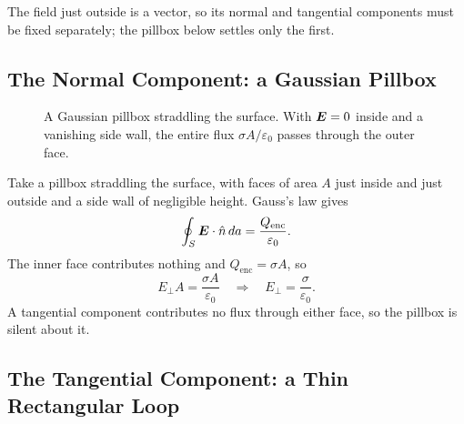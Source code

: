 The field just outside is a vector, so its normal and tangential components must be fixed separately; the pillbox below settles only the first.

\subsection{The Normal Component: a Gaussian Pillbox}

\begin{figure}[H]
\begin{center}
\end{center}
\caption{A Gaussian pillbox straddling the surface. With $\vect{E}=0$ inside and a vanishing side wall, the entire flux $\sigma A/\varepsilon_0$ passes through the outer face.}
\end{figure}

Take a pillbox straddling the surface, with faces of area $A$ just inside and just outside and a side wall of negligible height. Gauss's law gives
\[
    \oint_S \vect{E}\cdot\hat{n}\,da = \frac{Q_\text{enc}}{\varepsilon_0}.
\]
The inner face contributes nothing and $Q_\text{enc}=\sigma A$, so
\[
    E_\perp A = \frac{\sigma A}{\varepsilon_0} \quad\Longrightarrow\quad E_\perp = \frac{\sigma}{\varepsilon_0}.
\]
A tangential component contributes no flux through either face, so the pillbox is silent about it.

\subsection{The Tangential Component: a Thin Rectangular Loop}

